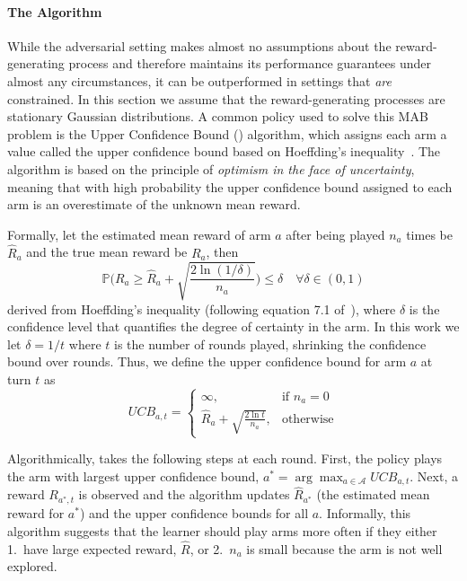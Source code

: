 \paragraph{The \ucb{} Algorithm}
While the adversarial setting makes almost no assumptions about the reward-generating process and therefore maintains its performance guarantees under almost any circumstances, it can be outperformed in settings that \textit{are} constrained. In this section we assume that the reward-generating processes are stationary Gaussian distributions.
A common policy used to solve this MAB problem is the Upper Confidence Bound (\ucb{}) algorithm, which assigns each arm a value called the upper confidence bound based on Hoeffding's inequality~\citep{auer2002finite}. The \ucb{} algorithm is based on the principle of \textit{optimism in the face of uncertainty}, meaning that with high probability the upper confidence bound assigned to each arm is an overestimate of the unknown mean reward.

Formally, let the estimated mean reward of arm $a$ after being played $n_{a}$ times be $\hat{R}_{a}$ and the true mean reward be $R_{a}$, then
\[
\mathbb{P}\bigg(R_{a} \ge \hat{R}_{a} + \sqrt{\frac{2\ln (1/\delta)}{n_{a}}}\bigg) \le\delta \quad\forall \delta\in (0,1)
\]
derived from Hoeffding's inequality (following equation 7.1 of~\citet{lattimore_szepesvári_2020}), where $\delta$ is the confidence level that quantifies the degree of certainty in the arm. In this work we let $\delta = 1/t$ where $t$ is the number of rounds played, shrinking the confidence bound over rounds. Thus, we define the upper confidence bound for arm $a$ at turn $t$ as
\begin{equation}
\label{eq:ucb}
UCB_{a,t} = 
\begin{cases}
\infty,& \text{if } n_{a}=0 \\
\hat{R}_{a}+\sqrt{\frac{2\ln t}{n_{a}}},& \text{otherwise}
\end{cases}
\end{equation}

Algorithmically, \ucb{} takes the following steps at each round. First, the \ucb{} policy plays the arm with largest upper confidence bound, $a^{*}=\arg\max_{a\in\mathcal{A}}UCB_{a,t}$. Next, a reward $R_{a^{*},t}$ is observed and the algorithm updates $\hat{R}_{a^{*}}$ (the estimated mean reward for $a^{*}$) and the upper confidence bounds for all $a$. Informally, this algorithm suggests that the learner should play arms more often if they either 1.\ have large expected reward, $\hat{R}$, or 2.\ $n_{a}$ is small because the arm is not well explored.

